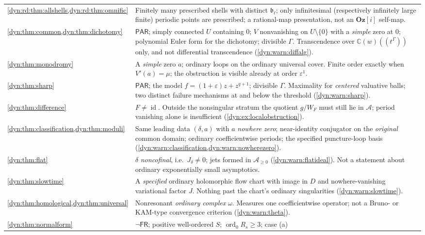 \documentclass[11pt,letterpaper]{article}
\theoremstyle{definition}
\theoremstyle{remark}
\newcommand{\C}{\mathbb C}
\newcommand{\AAA}{\mathscr A}
\newcommand{\id}{\operatorname{id}}
\newcommand{\ord}{\operatorname{ord}}
\newcommand{\eps}{\varepsilon}
\newcommand{\fres}{\mathsf{FR}}
\newcommand{\pares}{\mathsf{PAR}}
\newcommand{\Oz}{\mathbf{Oz}}
\numberwithin{equation}{section}
\begin{document}
\begin{longtable}{@{}P{0.26\textwidth}P{0.67\textwidth}@{}}
\cref{dyn:rd:thm:allshells,dyn:rd:thm:omnific} &
Finitely many prescribed shells with distinct $\mathfrak b_\ell$; only
infinitesimal (respectively infinitely large finite) periodic points are
prescribed; a rational-map presentation, not an $\Oz[i]$ self-map.\\[3pt]
\cref{dyn:thm:common,dyn:thm:dichotomy} &
$\pares$; simply connected $U$ containing $0$; $V$ nonvanishing on
$U\setminus\{0\}$ with a \emph{simple} zero at $0$; polynomial Euler form
for the dichotomy; divisible $\Gamma$. Transcendence over
$\C(w)((t^{\Gamma}))$ only, and not differential transcendence
(\cref{dyn:warn:diffalg}).\\[3pt]
\cref{dyn:thm:monodromy} &
A \emph{simple} zero $a$; ordinary loops on the ordinary universal cover.
Finite order exactly when $V'(a)=\mu$; the obstruction is visible already
at order $\eps^{1}$.\\[3pt]
\cref{dyn:thm:sharp} &
$\pares$; the model $f=(1+\eps)z+z^{q+1}$; divisible $\Gamma$. Maximality
for \emph{centered} valuative balls; two distinct failure mechanisms at and
below the threshold (\cref{dyn:warn:sharp}).\\[3pt]
\cref{dyn:thm:difference} &
$F\ne\id$. Outside the nonsingular stratum the quotient $g/W_F$ must still
lie in $\AAA$; period vanishing alone is insufficient
(\cref{dyn:ex:localobstruction}).\\[3pt]
\cref{dyn:thm:classification,dyn:thm:moduli} &
Same leading data $(\delta,a)$ with $a$ \emph{nowhere zero}; near-identity
conjugator on the \emph{original} common domain; ordinary coefficientwise
periods; the specified puncture-loop basis
(\cref{dyn:warn:classification,dyn:warn:nowherezero}).\\[3pt]
\cref{dyn:thm:flat} &
$\delta$ \emph{noncofinal}, i.e.\ $J_\delta\ne0$; jets formed in
$\AAA_{\ge0}$ (\cref{dyn:warn:flatideal}). Not a statement about ordinary
exponentially small asymptotics.\\[3pt]
\cref{dyn:thm:slowtime} &
A \emph{specified} ordinary holomorphic flow chart with image in $D$ and
nowhere-vanishing variational factor $J$. Nothing past the chart's ordinary
singularities (\cref{dyn:warn:slowtime}).\\[3pt]
\cref{dyn:thm:homological,dyn:thm:universal} &
Nonresonant \emph{ordinary complex} $\omega$. Measures one coefficientwise
operator; not a Bruno- or KAM-type convergence criterion
(\cref{dyn:warn:theta}).\\[3pt]
\cref{dyn:thm:normalform} &
$\lnot\fres$; positive well-ordered $S$; $\ord_0R_s\ge3$; case (a)

\end{longtable}
\end{document}
